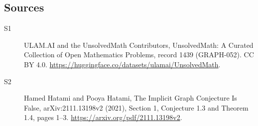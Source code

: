 \documentclass[11pt]{article}
\begin{document}
\subsection{Sources}
\begin{description}
\item[\hypertarget{source:1439:1}{S1}] ULAM.AI and the UnsolvedMath Contributors, UnsolvedMath: A Curated Collection of Open Mathematics Problems, record 1439 (GRAPH-052). CC BY 4.0. \url{https://huggingface.co/datasets/ulamai/UnsolvedMath}.
\item[\hypertarget{source:1439:2}{S2}] Hamed Hatami and Pooya Hatami, The Implicit Graph Conjecture Is False, arXiv:2111.13198v2 (2021), Section 1, Conjecture 1.3 and Theorem 1.4, pages 1--3. \url{https://arxiv.org/pdf/2111.13198v2}.
\end{description}
\label{end:1439}
\end{document}
